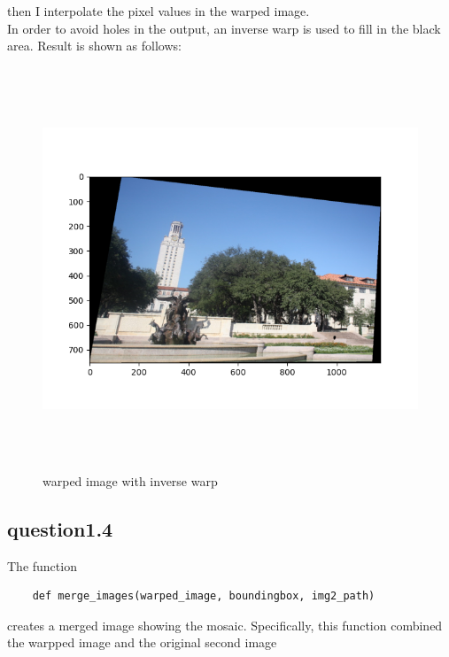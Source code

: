 \documentclass[a4paper,UTF8]{article}
\numberwithin{equation}{section}
\begin{document}
then I interpolate the pixel values in the warped image. \\
In order to avoid holes in the output, an inverse warp is used to fill in the black area. Result is shown as follows:
\begin{figure}[H]
	\centering  %
	\includegraphics[width=12cm,height=12cm]{warped_img_with_inverse_warp.png}  %
	\caption{warped image with inverse warp}  %
\end{figure}

\subsection{question1.4}
The function
\begin{lstlisting}
	def merge_images(warped_image, boundingbox, img2_path)
\end{lstlisting}
creates a merged image showing the mosaic. Specifically, this function combined the warpped image and the original second image
\end{document}
